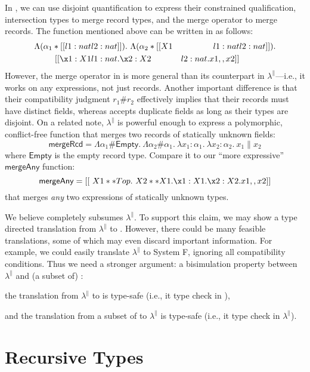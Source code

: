 In \fnamee, we can use disjoint quantification to express their constrained
qualification, intersection types to merge record types, and the merge operator
to merge records. The function mentioned above can be written in \fnamee as
follows:
\begin{align*}
  \Lambda (\alpha_1 * [[ {l1 : nat} & {l2 : nat} ]]) .\  \Lambda (\alpha_2 * [[  X1 & {l1 : nat} & {l2 : nat} ]]) . \\
  \qquad [[\x1 : X1 & {l1 : nat} . \x2 : X2 & {l2 : nat} . x1 ,, x2]]
\end{align*}
However, the merge operator in \fnamee is more general than its counterpart in
$\lambda^{\|}$---i.e., it works on any expressions, not just records. Another
important difference is that their compatibility judgment $r_1 \# r_2$
effectively implies that their records must have distinct fields, whereas
\fnamee accepts duplicate fields as long as their types are disjoint. On a
related note, $\lambda^{\|}$ is powerful enough to express a polymorphic,
conflict-free function that merges two records of statically unknown fields:
\[
  \mathsf{mergeRcd} = \Lambda \alpha_1 \# \mathsf{Empty} .\ \Lambda \alpha_2 \# \alpha_1 .\ \lambda x_1 : \alpha_1 .\ \lambda x_2 : \alpha_2 .\ x_1 \| x_2
\]
where $\mathsf{Empty}$ is the empty record type. Compare it to our ``more expressive'' $\mathsf{mergeAny}$ function:
\[
  \mathsf{mergeAny} = [[\ X1 ** Top . \ X2 ** X1 . \x1 : X1 . \x2 : X2 . x1 ,, x2 ]]
\]
that merges \emph{any} two expressions of statically unknown types.

We believe \fnamee completely subsumes $\lambda^{\|}$. To support this claim, we
may show a type directed translation from $\lambda^{\|}$ to \fnamee. However,
there could be many feasible translations, some of which may even discard important
information. For example, we could easily translate $\lambda^{\|}$ to System F,
ignoring all compatibility conditions. Thus we need a stronger argument: a
bisimulation property between $\lambda^{\|}$ and (a subset of) \fnamee:
\begin{inparaenum}[(1)]
\item the translation from $\lambda^{\|}$ to \fnamee is type-safe (i.e., it type check in \fnamee),
\item and the translation from a subset of \fnamee to $\lambda^{\|}$ is type-safe (i.e., it type check in $\lambda^{\|}$).
\end{inparaenum}


\section{Recursive Types}

